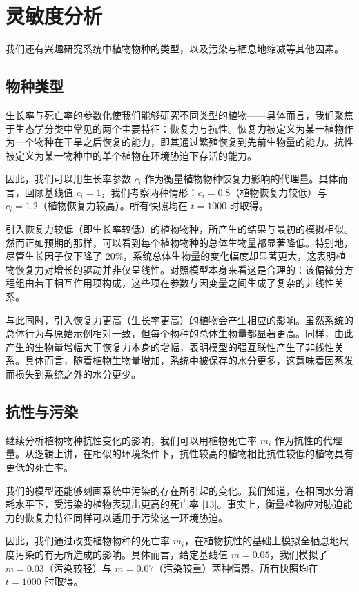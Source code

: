 \documentclass[11pt,a4paper]{ctexart}
\begin{document}
\section{灵敏度分析}

我们还有兴趣研究系统中植物物种的类型，以及污染与栖息地缩减等其他因素。

\subsection{物种类型}

生长率与死亡率的参数化使我们能够研究不同类型的植物——具体而言，我们聚焦于生态学分类中常见的两个主要特征：恢复力与抗性。恢复力被定义为某一植物作为一个物种在干旱之后恢复的能力，即其通过繁殖恢复到先前生物量的能力。抗性被定义为某一物种中的单个植物在环境胁迫下存活的能力。

因此，我们可以用生长率参数 $c_i$ 作为衡量植物物种恢复力影响的代理量。具体而言，回顾基线值 $c_i=1$，我们考察两种情形：$c_i=0.8$（植物恢复力较低）与 $c_i=1.2$（植物恢复力较高）。所有快照均在 $t=1000$ 时取得。

引入恢复力较低（即生长率较低）的植物物种，所产生的结果与最初的模拟相似。然而正如预期的那样，可以看到每个植物物种的总体生物量都显著降低。特别地，尽管生长因子仅下降了 20\%，系统总体生物量的变化幅度却显著更大，这表明植物恢复力对增长的驱动并非仅呈线性。对照模型本身来看这是合理的：该偏微分方程组由若干相互作用项构成，这些项在参数与因变量之间生成了复杂的非线性关系。

与此同时，引入恢复力更高（生长率更高）的植物会产生相应的影响。虽然系统的总体行为与原始示例相对一致，但每个物种的总体生物量都显著更高。同样，由此产生的生物量增幅大于恢复力本身的增幅，表明模型的强互联性产生了非线性关系。具体而言，随着植物生物量增加，系统中被保存的水分更多，这意味着因蒸发而损失到系统之外的水分更少。

\subsection{抗性与污染}

继续分析植物物种抗性变化的影响，我们可以用植物死亡率 $m_i$ 作为抗性的代理量。从逻辑上讲，在相似的环境条件下，抗性较高的植物相比抗性较低的植物具有更低的死亡率。

我们的模型还能够刻画系统中污染的存在所引起的变化。我们知道，在相同水分消耗水平下，受污染的植物表现出更高的死亡率 [13]。事实上，衡量植物应对胁迫能力的恢复力特征同样可以适用于污染这一环境胁迫。

因此，我们通过改变植物物种的死亡率 $m_i$，在植物抗性的基础上模拟全栖息地尺度污染的有无所造成的影响。具体而言，给定基线值 $m=0.05$，我们模拟了 $m=0.03$（污染较轻）与 $m=0.07$（污染较重）两种情景。所有快照均在 $t=1000$ 时取得。
\end{document}
